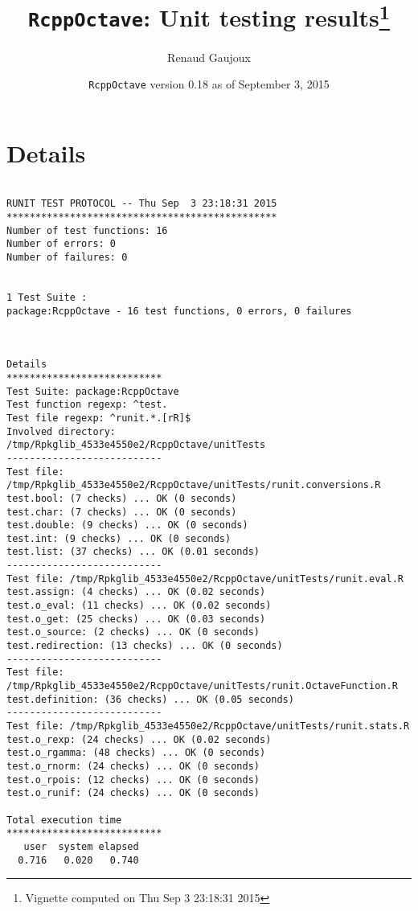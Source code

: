 \documentclass[10pt]{article}\usepackage[]{graphicx}\usepackage[]{color}
\author{Renaud Gaujoux}
\title{\texttt{RcppOctave}: Unit testing results\footnote{Vignette computed  on Thu Sep  3 23:18:31 2015}}
\date{\texttt{RcppOctave} version 0.18 as of September  3, 2015}
\begin{document}
\maketitle

\section{Details}
\begin{verbatim}

RUNIT TEST PROTOCOL -- Thu Sep  3 23:18:31 2015 
*********************************************** 
Number of test functions: 16 
Number of errors: 0 
Number of failures: 0 

 
1 Test Suite : 
package:RcppOctave - 16 test functions, 0 errors, 0 failures



Details 
*************************** 
Test Suite: package:RcppOctave 
Test function regexp: ^test. 
Test file regexp: ^runit.*.[rR]$ 
Involved directory: 
/tmp/Rpkglib_4533e4550e2/RcppOctave/unitTests 
--------------------------- 
Test file: /tmp/Rpkglib_4533e4550e2/RcppOctave/unitTests/runit.conversions.R 
test.bool: (7 checks) ... OK (0 seconds)
test.char: (7 checks) ... OK (0 seconds)
test.double: (9 checks) ... OK (0 seconds)
test.int: (9 checks) ... OK (0 seconds)
test.list: (37 checks) ... OK (0.01 seconds)
--------------------------- 
Test file: /tmp/Rpkglib_4533e4550e2/RcppOctave/unitTests/runit.eval.R 
test.assign: (4 checks) ... OK (0.02 seconds)
test.o_eval: (11 checks) ... OK (0.02 seconds)
test.o_get: (25 checks) ... OK (0.03 seconds)
test.o_source: (2 checks) ... OK (0 seconds)
test.redirection: (13 checks) ... OK (0 seconds)
--------------------------- 
Test file: /tmp/Rpkglib_4533e4550e2/RcppOctave/unitTests/runit.OctaveFunction.R 
test.definition: (36 checks) ... OK (0.05 seconds)
--------------------------- 
Test file: /tmp/Rpkglib_4533e4550e2/RcppOctave/unitTests/runit.stats.R 
test.o_rexp: (24 checks) ... OK (0.02 seconds)
test.o_rgamma: (48 checks) ... OK (0 seconds)
test.o_rnorm: (24 checks) ... OK (0 seconds)
test.o_rpois: (12 checks) ... OK (0 seconds)
test.o_runif: (24 checks) ... OK (0 seconds)

Total execution time
***************************
   user  system elapsed 
  0.716   0.020   0.740 

\end{verbatim}
\end{document}
